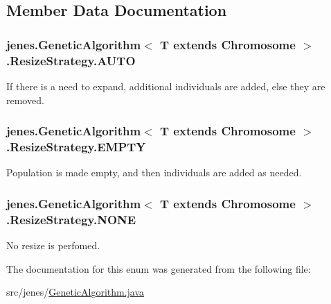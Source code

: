 \subsection{Member Data Documentation}
\hypertarget{enumjenes_1_1_genetic_algorithm_3_01_t_01extends_01_chromosome_01_4_1_1_resize_strategy_ab5fbe0d69a54b0b5286d2231726934e5}{
\subsubsection[{A\-U\-T\-O}]{\setlength{\rightskip}{0pt plus 5cm}jenes.\-Genetic\-Algorithm$<$ T extends Chromosome $>$.Resize\-Strategy.\-A\-U\-T\-O}}\label{enumjenes_1_1_genetic_algorithm_3_01_t_01extends_01_chromosome_01_4_1_1_resize_strategy_ab5fbe0d69a54b0b5286d2231726934e5}
If there is a need to expand, additional individuals are added, else they are removed. \hypertarget{enumjenes_1_1_genetic_algorithm_3_01_t_01extends_01_chromosome_01_4_1_1_resize_strategy_a69a9defbff3c22d92a210f7a72646869}{
\subsubsection[{E\-M\-P\-T\-Y}]{\setlength{\rightskip}{0pt plus 5cm}jenes.\-Genetic\-Algorithm$<$ T extends Chromosome $>$.Resize\-Strategy.\-E\-M\-P\-T\-Y}}\label{enumjenes_1_1_genetic_algorithm_3_01_t_01extends_01_chromosome_01_4_1_1_resize_strategy_a69a9defbff3c22d92a210f7a72646869}
Population is made empty, and then individuals are added as needed. \hypertarget{enumjenes_1_1_genetic_algorithm_3_01_t_01extends_01_chromosome_01_4_1_1_resize_strategy_a2efbc067403542b53491c6ca5d3200fe}{
\subsubsection[{N\-O\-N\-E}]{\setlength{\rightskip}{0pt plus 5cm}jenes.\-Genetic\-Algorithm$<$ T extends Chromosome $>$.Resize\-Strategy.\-N\-O\-N\-E}}\label{enumjenes_1_1_genetic_algorithm_3_01_t_01extends_01_chromosome_01_4_1_1_resize_strategy_a2efbc067403542b53491c6ca5d3200fe}
No resize is perfomed. 

The documentation for this enum was generated from the following file\-:\begin{DoxyCompactItemize}
\item 
src/jenes/\hyperlink{_genetic_algorithm_8java}{Genetic\-Algorithm.\-java}\end{DoxyCompactItemize}
